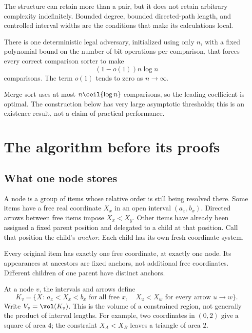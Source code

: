 The structure can retain more than a pair, but it does not retain arbitrary complexity indefinitely. Bounded degree, bounded directed-path length, and controlled interval widths are the conditions that make its calculations local.

\begin{theorem}\label{thm:main}
There is one deterministic legal adversary, initialized using only \(n\), with a fixed polynomial bound on the number of bit operations per comparison, that forces every correct comparison sorter to make
\[
(1-o(1))n\log n
\]
comparisons. The term \(o(1)\) tends to zero as \(n\to\infty\).
\end{theorem}

Merge sort uses at most \(n\ceil{\log n}\) comparisons, so the leading coefficient is optimal. The construction below has very large asymptotic thresholds; this is an existence result, not a claim of practical performance.

\section{The algorithm before its proofs}\label{sec:algorithm}

\subsection{What one node stores}

A node is a group of items whose relative order is still being resolved there. Some items have a free real coordinate \(X_x\) in an open interval \((a_x,b_x)\). Directed arrows between free items impose \(X_x<X_y\). Other items have already been assigned a fixed parent position and delegated to a child at that position. Call that position the child's \emph{anchor}. Each child has its own fresh coordinate system.

Every original item has exactly one free coordinate, at exactly one node. Its appearances at ancestors are fixed anchors, not additional free coordinates. Different children of one parent have distinct anchors.

At a node \(v\), the intervals and arrows define
\[
K_v=\{X:\ a_x<X_x<b_x\text{ for all free }x,\quad
                 X_u<X_w\text{ for every arrow }u\to w\}.
\]
Write \(V_v=\vol(K_v)\). This is the volume of a constrained region, not generally the product of interval lengths. For example, two coordinates in \((0,2)\) give a square of area \(4\); the constraint \(X_A<X_B\) leaves a triangle of area \(2\).

